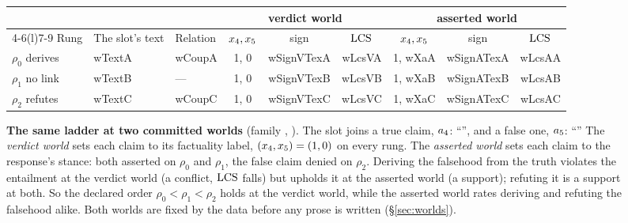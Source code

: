 \begin{figure}[t]
\centering\small
\setlength{\tabcolsep}{4pt}
\renewcommand{\arraystretch}{1.25}
\begin{tabular}{@{}l >{\raggedright\arraybackslash}p{5.35cm} l cc c cc c@{}}
\toprule
& & & \multicolumn{3}{c}{verdict world} & \multicolumn{3}{c}{asserted world} \\
\cmidrule(lr){4-6}\cmidrule(l){7-9}
Rung & The slot's text & Relation & $x_{4}, x_{5}$ & sign & $\mathrm{LCS}$
  & $x_{4}, x_{5}$ & sign & $\mathrm{LCS}$ \\
\midrule
$\rho_0$ derives & \csname wTextA\endcsname & \csname wCoupA\endcsname
  & 1, 0 & \csname wSignVTexA\endcsname & \csname wLcsVA\endcsname
  & 1, \csname wXaA\endcsname & \csname wSignATexA\endcsname & \csname wLcsAA\endcsname \\
$\rho_1$ no link & \csname wTextB\endcsname & ---
  & 1, 0 & \csname wSignVTexB\endcsname & \csname wLcsVB\endcsname
  & 1, \csname wXaB\endcsname & \csname wSignATexB\endcsname & \csname wLcsAB\endcsname \\
$\rho_2$ refutes & \csname wTextC\endcsname & \csname wCoupC\endcsname
  & 1, 0 & \csname wSignVTexC\endcsname & \csname wLcsVC\endcsname
  & 1, \csname wXaC\endcsname & \csname wSignATexC\endcsname & \csname wLcsAC\endcsname \\
\bottomrule
\end{tabular}
\caption{\textbf{The same ladder at two committed worlds} (family \wFamily, ). The slot
joins a true claim, $a_{4}$: ``\wTrue'', and a false one, $a_{5}$: ``\wFalse''
The \emph{verdict world} sets each claim to its factuality label, $(x_{4},
x_{5})=(1,0)$ on every rung. The \emph{asserted world} sets each claim to the response's
stance: both asserted on $\rho_0$ and $\rho_1$, the false claim denied on $\rho_2$. Deriving the
falsehood from the truth violates the entailment at the verdict world (a conflict, $\mathrm{LCS}$ falls)
but upholds it at the asserted world (a support); refuting it is a support at both. So the
declared order $\rho_0<\rho_1<\rho_2$ holds at the verdict world, while the asserted world rates
deriving and refuting the falsehood alike. Both worlds are fixed by the data before any prose is
written (\S\ref{sec:worlds}).}
\label{fig:worlds}
\end{figure}

